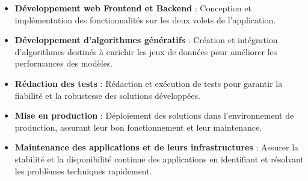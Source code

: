 \begin{itemize}\addtolength{\itemsep}{-0.35\baselineskip}%
  \item \textbf{Développement web Frontend et Backend} : Conception et implémentation des fonctionnalités sur les deux volets de l'application.
  \item \textbf{Développement d'algorithmes génératifs} : Création et intégration d'algorithmes destinés à enrichir les jeux de données pour améliorer les performances des modèles.
  \item \textbf{Rédaction des tests} : Rédaction et exécution de tests pour garantir la fiabilité et la robustesse des solutions développées.
  \item \textbf{Mise en production} : Déploiement des solutions dans l'environnement de production, assurant leur bon fonctionnement et leur maintenance.
  \item \textbf{Maintenance des applications et de leurs infrastructures} : Assurer la stabilité et la disponibilité continue des applications en identifiant et résolvant les problèmes techniques rapidement.
\end{itemize}

